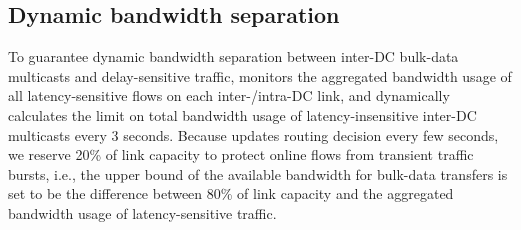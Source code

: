 \subsection{Dynamic bandwidth separation}
\label{subsec:system:separation}


To guarantee dynamic bandwidth separation between inter-DC
bulk-data multicasts and delay-sensitive traffic, \name
monitors the aggregated bandwidth usage of all
latency-sensitive flows on each inter-/intra-DC link, and dynamically
calculates the limit on total bandwidth usage of
latency-insensitive inter-DC multicasts every 3 seconds.
Because \name updates routing decision every few seconds,
we reserve 20\% of link capacity to protect online flows
from transient traffic bursts,
i.e., the upper bound of the available bandwidth for bulk-data
transfers is set to be the difference between 80\% of
link capacity and the aggregated bandwidth usage of
latency-sensitive traffic.



